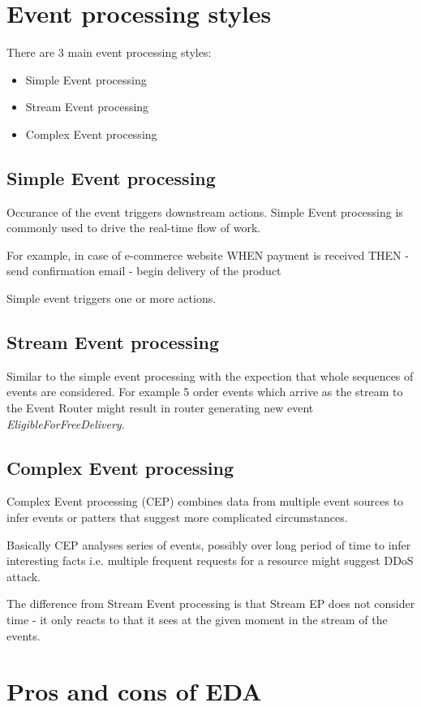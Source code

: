 \documentclass[12pt, a4paper]{article}
\begin{document}
\section{Event processing styles}
There are 3 main event processing styles:

\begin{itemize}
  \item Simple Event processing
  \item Stream Event processing
  \item Complex Event processing
\end{itemize}

\subsection{Simple Event processing}
Occurance of the event triggers downstream actions. Simple Event processing is commonly used to drive the real-time flow of work.

For example, in case of e-commerce website
WHEN payment is received THEN 
  - send confirmation email
  - begin delivery of the product

Simple event triggers one or more actions.  

\subsection{Stream Event processing}
Similar to the simple event processing with the expection that whole sequences of events are considered. For example 5 order events which arrive as the stream to the Event Router might result in router generating new event \emph{EligibleForFreeDelivery}.

\subsection{Complex Event processing}
Complex Event processing (CEP) combines data from multiple event sources to infer events or patters that suggest more complicated circumstances. 
  
Basically CEP analyses series of events, possibly over long period of time to infer interesting facts i.e. multiple frequent requests for a resource might suggest DDoS attack.

The difference from Stream Event processing is that Stream EP does not consider time - it only reacts to that it sees at the given moment in the stream of the events.

\section{Pros and cons of EDA}
\end{document}
